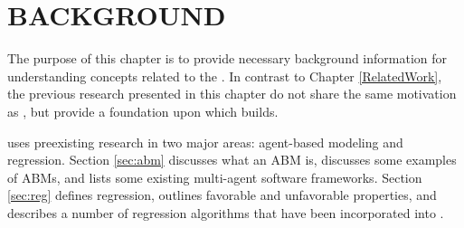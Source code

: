 \chapter{BACKGROUND}
\thispagestyle{plain}

\label{Background}

The purpose of this chapter is to provide necessary background information for understanding concepts related to the \framework.
In contrast to Chapter \ref{RelatedWork}, the previous research presented in this chapter do not share the same motivation as \fw, but provide a foundation upon which \fw builds.

\fw uses preexisting research in two major areas:
agent-based modeling and regression.
Section \ref{sec:abm} discusses what an ABM is, discusses some examples of ABMs, and lists some existing multi-agent software frameworks.
Section \ref{sec:reg} defines regression, outlines favorable and unfavorable properties, and describes a number of regression algorithms that have been incorporated into \fw.


